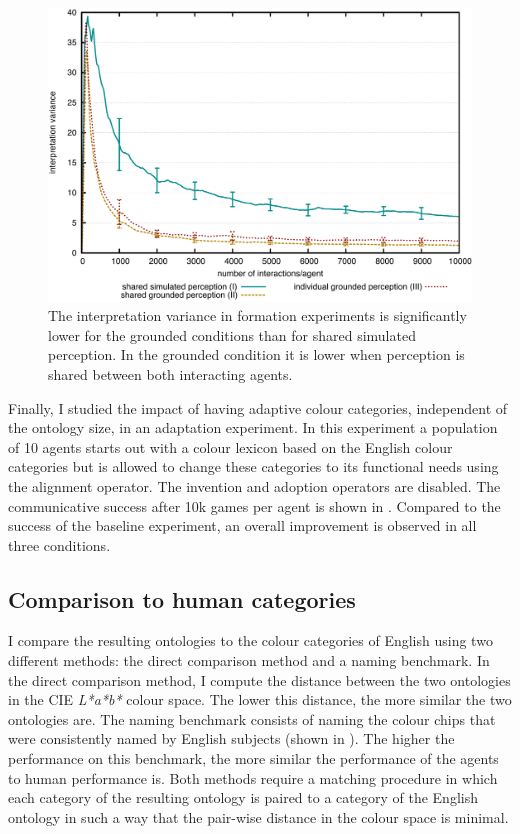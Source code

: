 \begin{figure}[htbp]
\begin{center}
  \includegraphics[width=.8\textwidth]{./experiments/figures/grounding-formation-interpretation-variance.pdf}
  \caption[Interpretation variance in grounded formation experiment in
  three experimental conditions]{The interpretation variance in
    formation experiments is significantly lower for the grounded
    conditions than for shared simulated perception. In the grounded
    condition it is lower when perception is shared between both
    interacting agents.}
\label{f:formation-interpretation-variance}
\end{center}
\end{figure}

Finally, I studied the impact of having adaptive colour
categories, independent of the ontology size, in an adaptation
experiment. In this experiment a population of 10 agents starts out
with a colour lexicon based on the English colour categories but is
allowed to change these categories to its functional needs using the
alignment operator. The invention and adoption operators are
disabled. The communicative success after 10k games per agent is shown
in . Compared to the
success of the baseline experiment, an overall improvement is observed
in all three conditions.

\subsection{Comparison to human categories}

I compare the resulting ontologies to the colour categories of English
\citep{sturges95location} using two different methods: the direct
comparison method and a naming benchmark. In the direct
comparison method, I compute the distance between the two ontologies
in the CIE \emph{L*a*b*} colour space. The lower this distance, the
more similar the two ontologies are. The naming benchmark consists of
naming the colour chips that were consistently named by English
subjects \citep{sturges95location} (shown in ). The higher the performance on
this benchmark, the more similar the performance of the agents to
human performance is. Both methods require a matching procedure in
which each category of the resulting ontology is paired to a category
of the English ontology in such a way that the pair-wise distance in
the colour space is minimal.

